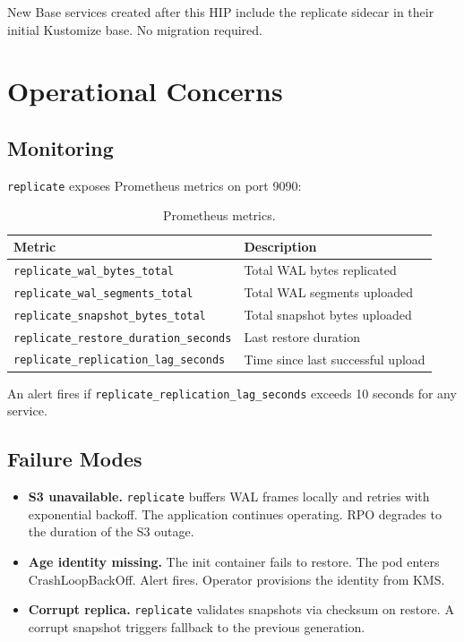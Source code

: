 \documentclass[11pt]{article}
\begin{document}
New Base services created after this HIP include the replicate sidecar in
their initial Kustomize base. No migration required.

\section{Operational Concerns}

\subsection{Monitoring}

\texttt{replicate} exposes Prometheus metrics on port 9090:

\begin{table}[H]
\centering
\begin{tabular}{@{}ll@{}}
\toprule
\textbf{Metric} & \textbf{Description} \\
\midrule
\texttt{replicate\_wal\_bytes\_total}      & Total WAL bytes replicated \\
\texttt{replicate\_wal\_segments\_total}   & Total WAL segments uploaded \\
\texttt{replicate\_snapshot\_bytes\_total} & Total snapshot bytes uploaded \\
\texttt{replicate\_restore\_duration\_seconds} & Last restore duration \\
\texttt{replicate\_replication\_lag\_seconds}  & Time since last successful upload \\
\bottomrule
\end{tabular}
\caption{Prometheus metrics.}
\label{tab:metrics}
\end{table}

An alert fires if \texttt{replicate\_replication\_lag\_seconds} exceeds 10
seconds for any service.

\subsection{Failure Modes}

\begin{itemize}[nosep]
    \item \textbf{S3 unavailable.} \texttt{replicate} buffers WAL frames
    locally and retries with exponential backoff. The application continues
    operating. RPO degrades to the duration of the S3 outage.

    \item \textbf{Age identity missing.} The init container fails to restore.
    The pod enters CrashLoopBackOff. Alert fires. Operator provisions the
    identity from KMS.

    \item \textbf{Corrupt replica.} \texttt{replicate} validates snapshots
    via checksum on restore. A corrupt snapshot triggers fallback to the
    previous generation.
\end{itemize}
\end{document}
